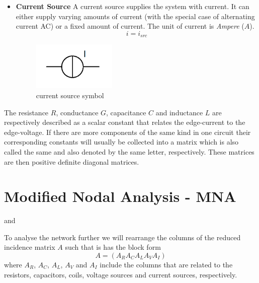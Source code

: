 \begin{itemize}
	\item \textbf{Current Source} \newline
	A current source supplies the system with current. It can either supply varying amounts of current (with the special case of alternating current AC) or a fixed amount of current. The unit of current is \emph{Ampere} ($A$).
	\begin{equation}
		\label{eq:current source law}
		i = i_{src}
	\end{equation}
	\begin{figure}[H]
		\label{fig:current source symbol}
		\centering
		\includegraphics[width=4cm]{pictures/current_source.png}
		\caption{current source symbol}
	\end{figure}
\end{itemize}

The resistance $R$, conductance $G$, capacitance $C$ and inductance $L$ are respectively described as a scalar constant that relates the edge-current to the edge-voltage. If there are more components of the same kind in one circuit their corresponding constants will usually be collected into a matrix which is also called the same and also denoted by the same letter, respectively. These matrices are then positive definite diagonal matrices.

\section{Modified Nodal Analysis - MNA}
\label{sec:MNA}


\cite{ModellingAndDiscretizationOfCircuitProblems} and \cite{NumerikGewöhnlicherDifferentialgleichungen}

To analyse the network further we will rearrange the columns of the reduced incidence matrix $A$ such that is has the block form
\begin{displaymath}
	A = (A_R A_C A_L A_V A_I)
\end{displaymath}
where $A_R$, $A_C$, $A_L$, $A_V$ and $A_I$ include the columns that are related to the resistors, capacitors, coils, voltage sources and current sources, respectively.

